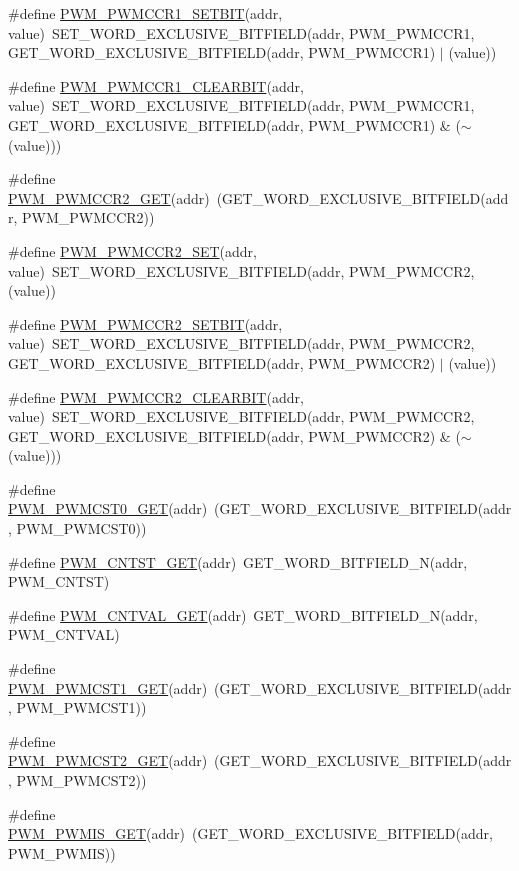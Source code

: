 \begin{DoxyCompactItemize}
\item 
\#define \hyperlink{a00564_a8ce20fbe7cdc55d946a64bc15ebe2f43}{PWM\_\-PWMCCR1\_\-SETBIT}(addr, value)~SET\_\-WORD\_\-EXCLUSIVE\_\-BITFIELD(addr, PWM\_\-PWMCCR1, GET\_\-WORD\_\-EXCLUSIVE\_\-BITFIELD(addr, PWM\_\-PWMCCR1) $|$ (value))
\item 
\#define \hyperlink{a00564_a643ed63e44bd433f344946684c2b1698}{PWM\_\-PWMCCR1\_\-CLEARBIT}(addr, value)~SET\_\-WORD\_\-EXCLUSIVE\_\-BITFIELD(addr, PWM\_\-PWMCCR1, GET\_\-WORD\_\-EXCLUSIVE\_\-BITFIELD(addr, PWM\_\-PWMCCR1) \& ($\sim$(value)))
\item 
\#define \hyperlink{a00564_a94307f654ce6af547c79da0108c16c1c}{PWM\_\-PWMCCR2\_\-GET}(addr)~(GET\_\-WORD\_\-EXCLUSIVE\_\-BITFIELD(addr, PWM\_\-PWMCCR2))
\item 
\#define \hyperlink{a00564_a302314df237d0329288ed2ff3687a0f1}{PWM\_\-PWMCCR2\_\-SET}(addr, value)~SET\_\-WORD\_\-EXCLUSIVE\_\-BITFIELD(addr, PWM\_\-PWMCCR2, (value))
\item 
\#define \hyperlink{a00564_a138bbe1e549d57512a3a3b4c7a6cbd43}{PWM\_\-PWMCCR2\_\-SETBIT}(addr, value)~SET\_\-WORD\_\-EXCLUSIVE\_\-BITFIELD(addr, PWM\_\-PWMCCR2, GET\_\-WORD\_\-EXCLUSIVE\_\-BITFIELD(addr, PWM\_\-PWMCCR2) $|$ (value))
\item 
\#define \hyperlink{a00564_a6c6d615793502c3077897e32c7ffc16d}{PWM\_\-PWMCCR2\_\-CLEARBIT}(addr, value)~SET\_\-WORD\_\-EXCLUSIVE\_\-BITFIELD(addr, PWM\_\-PWMCCR2, GET\_\-WORD\_\-EXCLUSIVE\_\-BITFIELD(addr, PWM\_\-PWMCCR2) \& ($\sim$(value)))
\item 
\#define \hyperlink{a00564_a3886a1704767e5b7df2aca90138cc427}{PWM\_\-PWMCST0\_\-GET}(addr)~(GET\_\-WORD\_\-EXCLUSIVE\_\-BITFIELD(addr, PWM\_\-PWMCST0))
\item 
\#define \hyperlink{a00564_a2204276d5249d12131c8f4681edad0e8}{PWM\_\-CNTST\_\-GET}(addr)~GET\_\-WORD\_\-BITFIELD\_\-N(addr, PWM\_\-CNTST)
\item 
\#define \hyperlink{a00564_a0c9dc455d6cbf5f4447b072b1265acc8}{PWM\_\-CNTVAL\_\-GET}(addr)~GET\_\-WORD\_\-BITFIELD\_\-N(addr, PWM\_\-CNTVAL)
\item 
\#define \hyperlink{a00564_a616c856c9be6c244bf771a1a1fa80242}{PWM\_\-PWMCST1\_\-GET}(addr)~(GET\_\-WORD\_\-EXCLUSIVE\_\-BITFIELD(addr, PWM\_\-PWMCST1))
\item 
\#define \hyperlink{a00564_aaabd65f6f32888657ae301ecf4b58cc9}{PWM\_\-PWMCST2\_\-GET}(addr)~(GET\_\-WORD\_\-EXCLUSIVE\_\-BITFIELD(addr, PWM\_\-PWMCST2))
\item 
\#define \hyperlink{a00564_a727918a05305d53b9116708f3d97e5cb}{PWM\_\-PWMIS\_\-GET}(addr)~(GET\_\-WORD\_\-EXCLUSIVE\_\-BITFIELD(addr, PWM\_\-PWMIS))

\end{DoxyCompactItemize}

